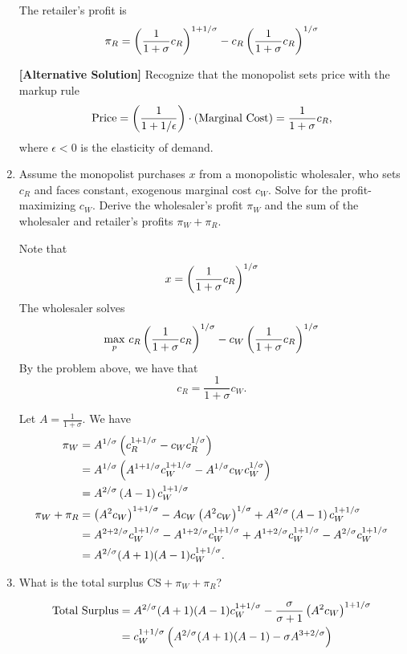 \documentclass[11pt]{article}
\begin{document}
\begin{enumerate}
\begin{sol}
         The retailer's profit is \[
         \pi_R = \left({\frac{1}{1+\sigma} c_R }\right)^{1 + 1/\sigma} - c_R\left({\frac{1}{1+\sigma} c_R }\right)^{1/\sigma}
         \]
         
     \end{sol}
     \begin{sol}\textbf{[Alternative Solution]}
          Recognize that the monopolist sets price with the markup rule \[
          \text{Price} = \left({\frac{1}{1+1/\epsilon}}\right) \cdot \left({\text{Marginal Cost}}\right) = \frac{1}{1+\sigma} c_R,
          \]
          where $\epsilon < 0$ is the elasticity of demand.
      \end{sol} 
     \item Assume the monopolist purchases $x$ from a monopolistic wholesaler, who sets $c_R$ and faces constant, exogenous marginal cost $c_W$. Solve for the profit-maximizing $c_W$. Derive the wholesaler's profit $\pi_W$ and the sum of the wholesaler and retailer's profits $\pi_W + \pi_R$.
     \begin{sol}
     Note that \[
     x = \left({\frac{1}{1+\sigma} c_R }\right)^{1/\sigma}
     \]
         The wholesaler solves \[
         \max_p \, c_R \left({\frac{1}{1+\sigma}c_R }\right)^{1/\sigma} - c_W \left({\frac{1}{1+\sigma} c_R}\right)^{1/\sigma}
         \]
    By the problem above, we have that \[c_R = \frac{1}{1+\sigma} c_W.\] 
    
    Let $A = \frac{1}{1+\sigma}$. We have \begin{align*}
        \pi_W &= A^{1/\sigma} \left({c_R^{1+1/\sigma} - c_W c_R^{1/\sigma}}\right)
        \\
        &=  A^{1/\sigma} \left({A^{1+1/\sigma} c_W^{1+1/\sigma} - A^{1/\sigma}c_W c_W^{1/\sigma}}\right) \\
        &= A^{2/\sigma} \left({A-1}\right)c_W^{1+1/\sigma}\\
        \pi_W + \pi_R &= \left({A^2 c_W}\right)^{1 + 1/\sigma} - A c_W \left({A^2 c_W}\right)^{1/\sigma} + A^{2/\sigma} \left({A-1}\right)c_W^{1+1/\sigma} \\
        &= A^{2+2/\sigma} c_W^{1+1/\sigma} - A^{1+2/\sigma} c_W^{1+1/\sigma} + A^{1 + 2/\sigma} c_W^{1+1/\sigma} - A^{2/\sigma}c_W^{1+1/\sigma} \\
        &= A^{2/\sigma} (A+1)(A-1) c_W^{1+1/\sigma}.
    \end{align*}
    
     \end{sol}
     
     \item What is the total surplus $\text{CS} + \pi_W + \pi_R$?
     \begin{sol}
     \begin{align*}
     \text{Total Surplus} &= A^{2/\sigma} (A+1)(A-1) c_W^{1+1/\sigma} - \frac{\sigma}{\sigma + 1} \left({A^2 c_W}\right)^{1 + 1/\sigma} \\
     &= c_W^{1+1/\sigma} \left({A^{2/\sigma} (A+1)(A-1) - \sigma A^{3+2/\sigma}}\right)
     \end{align*}
     \end{sol}
     

\end{enumerate}
\end{document}
